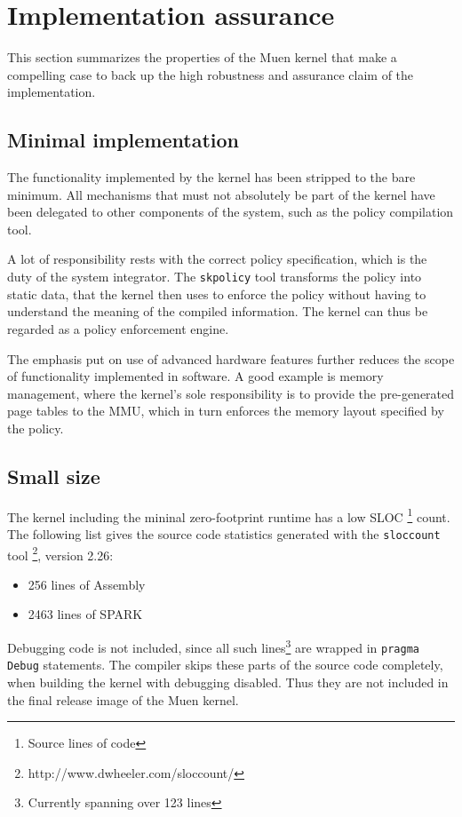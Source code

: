 \section{Implementation assurance}\label{sec:impl-assurance}
This section summarizes the properties of the Muen kernel that make a compelling
case to back up the high robustness and assurance claim of the implementation.

\subsection{Minimal implementation}
The functionality implemented by the kernel has been stripped to the bare
minimum. All mechanisms that must not absolutely be part of the kernel have been
delegated to other components of the system, such as the policy compilation
tool.

A lot of responsibility rests with the correct policy specification, which is
the duty of the system integrator. The \texttt{skpolicy} tool transforms the
policy into static data, that the kernel then uses to enforce the policy without
having to understand the meaning of the compiled information. The kernel can
thus be regarded as a policy enforcement engine.

The emphasis put on use of advanced hardware features further reduces the scope
of functionality implemented in software. A good example is memory management,
where the kernel's sole responsibility is to provide the pre-generated page
tables to the MMU, which in turn enforces the memory layout specified by the
policy.

\subsection{Small size}
The kernel including the mininal zero-footprint runtime has a low SLOC
\footnote{Source lines of code} count. The following list gives the source code
statistics generated with the \texttt{sloccount} tool
\footnote{http://www.dwheeler.com/sloccount/}, version 2.26:

\begin{itemize}
	\item 256 lines of Assembly
	\item 2463 lines of SPARK
\end{itemize}

Debugging code is not included, since all such lines\footnote{Currently spanning
over 123 lines} are wrapped in \texttt{pragma Debug} statements. The compiler
skips these parts of the source code completely, when building the kernel with
debugging disabled. Thus they are not included in the final release image of the
Muen kernel.

